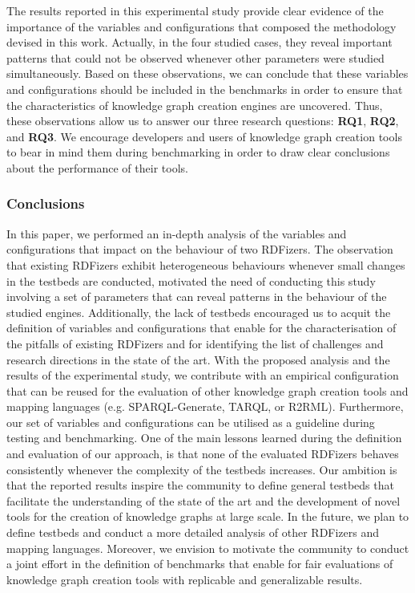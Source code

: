 The results reported in this experimental study provide clear evidence of the importance of the variables and configurations that composed the methodology devised in this work. Actually, in the four studied cases, they reveal important patterns that could not be observed whenever other parameters were studied simultaneously. Based on these observations, we can conclude that these variables and configurations should be included in the benchmarks in order to ensure that the characteristics of knowledge graph creation engines are uncovered. Thus, these observations allow us to answer our three research questions: \textbf{RQ1}, \textbf{RQ2}, and \textbf{RQ3}. We encourage developers and users of knowledge graph creation tools to bear in mind them during benchmarking in order to draw clear conclusions about the performance of their tools.


\subsubsection{Conclusions}
In this paper, we performed an in-depth analysis of the variables and configurations that impact on the behaviour of two RDFizers. The observation that existing RDFizers exhibit heterogeneous behaviours whenever small changes in the testbeds are conducted, motivated the need of conducting this study involving a set of parameters that can reveal patterns in the behaviour of the studied engines. Additionally, the lack of testbeds encouraged us to acquit the definition of variables and configurations that enable for the characterisation of the pitfalls of existing RDFizers and for identifying the list of challenges and research directions in the state of the art. 
With the proposed analysis and the results of the experimental study, we contribute with an empirical configuration that can be reused for the evaluation of other knowledge graph creation tools and mapping languages (e.g. SPARQL-Generate, TARQL, or R2RML). Furthermore, our set of variables and configurations can be utilised as a guideline during testing and benchmarking. One of the main lessons learned during the definition and evaluation of our approach, is that none of the evaluated RDFizers  behaves consistently whenever the complexity of the testbeds increases. Our ambition is that the reported results inspire the community to define general testbeds that facilitate the understanding of the state of the art and the development of novel tools for the creation of knowledge graphs at large scale.  In the future, we plan to define testbeds and conduct a more detailed analysis of other RDFizers and mapping languages. Moreover, we envision to motivate the community to conduct a joint effort in the definition of benchmarks that enable for  fair evaluations of knowledge graph creation tools with replicable and generalizable results. 
